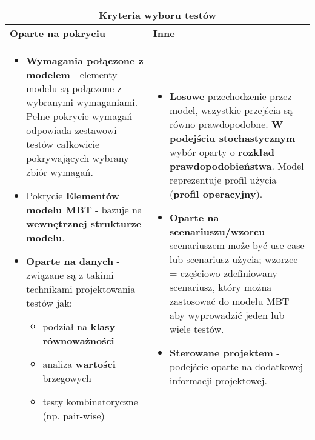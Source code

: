 \documentclass[../main.tex]{subfiles}
\begin{document}
    \begin{table}[H]
        \begin{center}
            \begin{tabular}{| p{8cm} | p{8cm} |}
                \hline
                \multicolumn{2}{|c|}{\textbf{Kryteria wyboru testów}}\\
                \hline
                \textbf{Oparte na pokryciu} & \textbf{Inne}\\
                \hline
                \begin{itemize}
                    \item \textbf{Wymagania połączone z modelem} - elementy modelu są połączone z wybranymi
                    wymaganiami. Pełne pokrycie wymagań odpowiada zestawowi testów całkowicie pokrywających wybrany zbiór wymagań.

                    \item Pokrycie \textbf{Elementów modelu MBT} - bazuje na \textbf{wewnętrznej strukturze modelu}.

                    \item \textbf{Oparte na danych} - związane są z takimi technikami projektowania testów jak:
                    \begin{itemize}
                        \item podział na \textbf{klasy równoważności}
                        \item analiza \textbf{wartości} brzegowych
                        \item testy kombinatoryczne (np. pair-wise)
                    \end{itemize}
                \end{itemize}
                &
                \begin{itemize}
                    \item \textbf{Losowe} przechodzenie przez model, wszystkie przejścia są równo
                    prawdopodobne. \textbf{W podejściu stochastycznym} wybór oparty o \textbf{rozkład prawdopodobieństwa}. Model reprezentuje profil
                    użycia (\textbf{profil operacyjny}).
                    \item \textbf{Oparte na scenariuszu/wzorcu} - scenariuszem może być use case lub
                    scenariusz użycia; wzorzec = częściowo zdefiniowany scenariusz, który można
                    zastosować do modelu MBT aby wyprowadzić jeden lub wiele testów.
                    \item \textbf{Sterowane projektem} - podejście oparte na dodatkowej informacji projektowej.
                \end{itemize}\\
                \hline
            \end{tabular}
        \end{center}
    \end{table}
\end{document}
